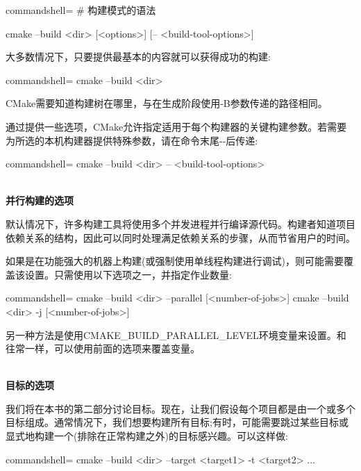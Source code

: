 \begin{tcblisting}{commandshell={}}
# 构建模式的语法

cmake --build <dir> [<options>] [-- <build-tool-options>]
\end{tcblisting}

大多数情况下，只要提供最基本的内容就可以获得成功的构建:

\begin{tcblisting}{commandshell={}}
cmake --build <dir>
\end{tcblisting}

CMake需要知道构建树在哪里，与在生成阶段使用-B参数传递的路径相同。

通过提供一些选项，CMake允许指定适用于每个构建器的关键构建参数。若需要为所选的本机构建器提供特殊参数，请在命令末尾-{}-后传递:

\begin{tcblisting}{commandshell={}}
cmake --build <dir> -- <build-tool-options>
\end{tcblisting}

\hspace*{\fill} \\ %
\noindent
\textbf{并行构建的选项}

默认情况下，许多构建工具将使用多个并发进程并行编译源代码。构建者知道项目依赖关系的结构，因此可以同时处理满足依赖关系的步骤，从而节省用户的时间。

如果是在功能强大的机器上构建(或强制使用单线程构建进行调试)，则可能需要覆盖该设置。只需使用以下选项之一，并指定作业数量:

\begin{tcblisting}{commandshell={}}
cmake --build <dir> --parallel [<number-of-jobs>]
cmake --build <dir> -j [<number-of-jobs>]
\end{tcblisting}

另一种方法是使用CMAKE\_BUILD\_PARALLEL\_LEVEL环境变量来设置。和往常一样，可以使用前面的选项来覆盖变量。

\hspace*{\fill} \\ %
\noindent
\textbf{目标的选项}

我们将在本书的第二部分讨论目标。现在，让我们假设每个项目都是由一个或多个目标组成。通常情况下，我们想要构建所有目标;有时，可能需要跳过某些目标或显式地构建一个(排除在正常构建之外)的目标感兴趣。可以这样做:

\begin{tcblisting}{commandshell={}}
cmake --build <dir> --target <target1> -t <target2> ...
\end{tcblisting}

